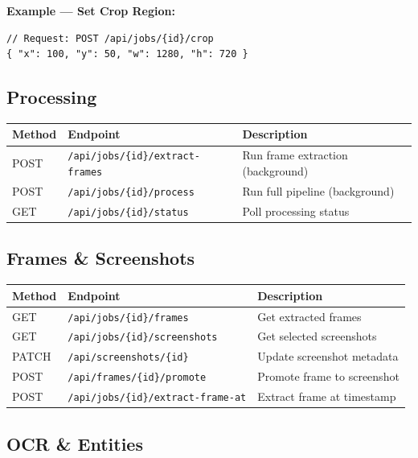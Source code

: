 \documentclass[12pt, a4paper]{article}
\newcommand{\codeinline}[1]{\texttt{\small\colorbox{codebg}{#1}}}
\begin{document}
\vspace{0.5cm}

\textbf{Example --- Set Crop Region:}
\begin{lstlisting}[style=json]
// Request: POST /api/jobs/{id}/crop
{ "x": 100, "y": 50, "w": 1280, "h": 720 }
\end{lstlisting}

\subsection{Processing}

\begin{tabularx}{\textwidth}{@{} l l X @{}}
    \toprule
    \textbf{Method} & \textbf{Endpoint} & \textbf{Description} \\
    \midrule
    POST & \codeinline{/api/jobs/\{id\}/extract-frames} & Run frame extraction (background) \\
    POST & \codeinline{/api/jobs/\{id\}/process} & Run full pipeline (background) \\
    GET & \codeinline{/api/jobs/\{id\}/status} & Poll processing status \\
    \bottomrule
\end{tabularx}

\subsection{Frames \& Screenshots}

\begin{tabularx}{\textwidth}{@{} l l X @{}}
    \toprule
    \textbf{Method} & \textbf{Endpoint} & \textbf{Description} \\
    \midrule
    GET & \codeinline{/api/jobs/\{id\}/frames} & Get extracted frames \\
    GET & \codeinline{/api/jobs/\{id\}/screenshots} & Get selected screenshots \\
    PATCH & \codeinline{/api/screenshots/\{id\}} & Update screenshot metadata \\
    POST & \codeinline{/api/frames/\{id\}/promote} & Promote frame to screenshot \\
    POST & \codeinline{/api/jobs/\{id\}/extract-frame-at} & Extract frame at timestamp \\
    \bottomrule
\end{tabularx}

\subsection{OCR \& Entities}
\end{document}
